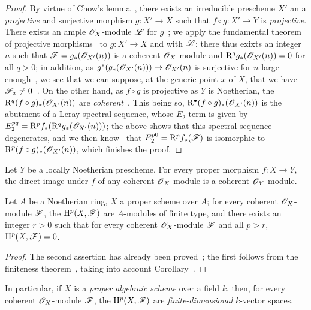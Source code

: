 \begin{proof}
By virtue of Chow's lemma~, there exists an irreducible prescheme $X'$ an a \emph{projective} and surjective morphism $g:X'\to X$ such that $f\circ g:X'\to Y$ is \emph{projective}.
There exists an ample $\mathscr{O}_X$-module $\mathscr{L}$ for $g$~; we apply the fundamental theorem of projective morphisms~ to $g:X'\to X$ and with $\mathscr{L}$: there thus exixts an integer $n$ such that $\mathscr{F}=g_*(\mathscr{O}_{X'}(n))$ is a coherent $\mathscr{O}_X$-module and $\mathrm{R}^q g_*(\mathscr{O}_{X'}(n))=0$ for all $q>0$; in addition, as $g^*(g_*(\OO_{X'}(n)))\to\OO_{X'}(n)$ is surjective for $n$ large enough~, we see that we can suppose, at the generic point $x$ of $X$, that we have $\mathscr{F}_x\neq 0$~.
On the other hand, as $f\circ g$ is projective as $Y$ is Noetherian, the $\mathrm{R}^q(f\circ g)_*(\mathscr{O}_{X'}(n))$ are \emph{coherent}~.
This being so, $\mathrm{R}^\bullet(f\circ g)_*(\mathscr{O}_{X'}(n))$ is the abutment of a Leray spectral sequence, whose $E_2$-term is given by $E_2^{pq}=\mathrm{R}^p f_*(\mathrm{R}^q g_*(\mathscr{O}_{X'}(n)))$; the above shows that this spectral sequence degenerates, and we then know~ that $E_2^{p0}=\mathrm{R}^p f_*(\mathscr{F})$ is isomorphic to $\mathrm{R}^p(f\circ g)_*(\mathscr{O}_{X'}(n))$, which finishes the proof.
\end{proof}

\begin{cor}[3.2.2]
\label{3.3.2.2}
Let $Y$ be a locally Noetherian prescheme.
For every proper morphism $f:X\to Y$, the direct image under $f$ of any coherent $\mathscr{O}_X$-module is a coherent $\mathscr{O}_Y$-module.
\end{cor}

\begin{cor}[3.2.3]
\label{3.3.2.3}
Let $A$ be a Noetherian ring, $X$ a proper scheme over $A$; for every coherent $\mathscr{O}_X$-module $\mathscr{F}$, the $\mathrm{H}^p(X,\mathscr{F})$ are $A$-modules of finite type, and there exists an integer $r>0$ such that for every coherent $\mathscr{O}_X$-module $\mathscr{F}$ and all $p>r$, $\mathrm{H}^p(X,\mathscr{F})=0$.
\end{cor}

\begin{proof}
\label{proof-3.3.2.3}
The second assertion has already been proved~; the first follows from the finiteness theorem~, taking into account Corollary~.
\end{proof}

In particular, if $X$ is a \emph{proper algebraic scheme} over a field $k$, then, for every coherent $\mathscr{O}_X$-module $\mathscr{F}$, the $\mathrm{H}^p(X,\mathscr{F})$ are \emph{finite-dimensional} $k$-vector spaces.

